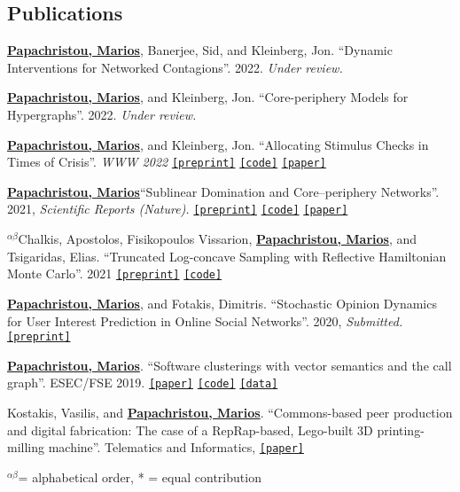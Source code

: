 \documentclass[margin]{res}
\newcommand{\alphabeticalorder}[0]{\ensuremath {^{\alpha \beta}}}
\newcommand{\specialurl}[2]{\href {#2} {\texttt{[#1]}}}
\newcommand{\preprint}[1]{\specialurl {preprint} {#1}}
\newcommand{\code}[1]{\specialurl {code} {#1}}
\newcommand{\data}[1]{\specialurl {data} {#1}}
\newcommand{\paper}[1]{\specialurl {paper} {#1}}
\newcommand{\authorref}[1]{\underline {\textbf{#1}}}
\newcommand{\authorme}{\authorref{Papachristou, Marios}}
\begin{document}
\begin{resume}
\section{Publications}

\begin{compactenum}
   \item \authorme, Banerjee, Sid, and Kleinberg, Jon. ``Dynamic Interventions for Networked Contagions''. 2022. \emph{Under review.}
   \item \authorme, and Kleinberg, Jon. ``Core-periphery Models for Hypergraphs''. 2022. \emph{Under review.}
   \item  \authorme, and Kleinberg, Jon. ``Allocating Stimulus Checks in Times of Crisis''. \emph{WWW 2022} \preprint{https://arxiv.org/abs/2106.07560} \code{https://github.com/papachristoumarios/financial-contagion} \paper{https://doi.org/10.1145/3485447.3512047}    
   \item \authorme ``Sublinear Domination and Core--periphery Networks''. 2021,  \emph{Scientific Reports (Nature).}  \preprint{https://arxiv.org/abs/2103.03135} \code{https://bit.ly/3wKNGI0} \paper{http://www.nature.com/articles/s41598-021-94105-8}
    \item \alphabeticalorder Chalkis, Apostolos, Fisikopoulos Vissarion, \authorme, and Tsigaridas, Elias. ``Truncated Log-concave Sampling with Reflective Hamiltonian Monte Carlo''. 2021 \preprint{https://arxiv.org/abs/2102.13068} \code{https://github.com/GeomScale/volume_approximation}
    \item \authorme, and Fotakis, Dimitris. ``Stochastic Opinion Dynamics for User Interest Prediction in Online Social Networks''. 2020, \emph{Submitted.}  \preprint{https://www.researchgate.net/publication/353006940_Stochastic_Opinion_Dynamics_for_Interest_Prediction_in_Social_Networks}
    \item \authorme. ``Software clusterings with vector semantics and the call graph''. ESEC/FSE 2019.  \paper{https://dl.acm.org/citation.cfm?id=3342483} \code{https://github.com/papachristoumarios/sade} \data{http://doi.org/10.5281/zenodo.2652487}
    \item Kostakis, Vasilis, and \authorme. ``Commons-based peer production and digital fabrication: The case of a RepRap-based, Lego-built 3D printing-milling machine''. Telematics and Informatics,  \paper{https://bit.ly/2JRoisV} 
    
\end{compactenum}

\alphabeticalorder  = alphabetical order, * = equal contribution


\end{resume}
\end{document}
